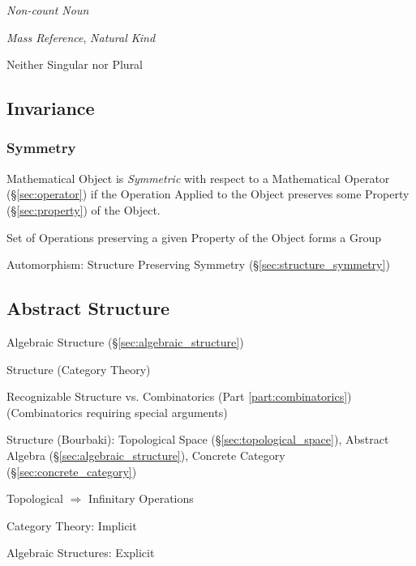 \emph{Non-count Noun}

\emph{Mass Reference}, \emph{Natural Kind}

Neither Singular nor Plural



\subsection{Invariance}\label{sec:invariance}

\subsubsection{Symmetry}\label{sec:symmetry}

Mathematical Object is \emph{Symmetric} with respect to a Mathematical
Operator (\S\ref{sec:operator}) if the Operation Applied to the Object
preserves some Property (\S\ref{sec:property}) of the Object.

Set of Operations preserving a given Property of the Object forms a
Group %

Automorphism: Structure Preserving Symmetry
(\S\ref{sec:structure_symmetry})



\subsection{Abstract Structure}\label{sec:abstract_structure}


Algebraic Structure (\S\ref{sec:algebraic_structure})

Structure (Category Theory) %

Recognizable Structure vs. Combinatorics (Part
\ref{part:combinatorics}) (Combinatorics requiring special arguments)

Structure (Bourbaki): Topological Space
(\S\ref{sec:topological_space}), Abstract Algebra
(\S\ref{sec:algebraic_structure}), Concrete Category
(\S\ref{sec:concrete_category})

Topological $\Rightarrow$ Infinitary Operations

Category Theory: Implicit

Algebraic Structures: Explicit

